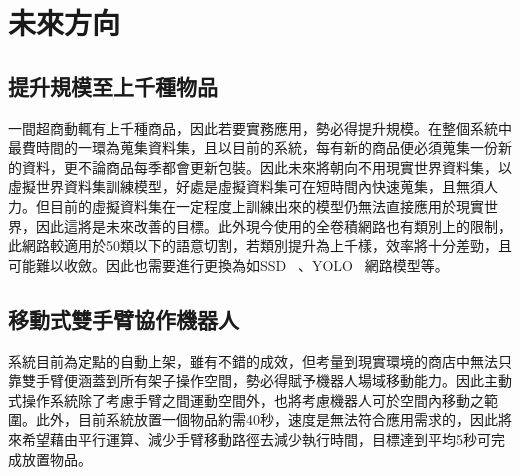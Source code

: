 \section{未來方向}

\subsection{提升規模至上千種物品}
一間超商動輒有上千種商品，因此若要實務應用，勢必得提升規模。在整個系統中最費時間的一環為蒐集資料集，且以目前的系統，每有新的商品便必須蒐集一份新的資料，更不論商品每季都會更新包裝。因此未來將朝向不用現實世界資料集，以虛擬世界資料集訓練模型，好處是虛擬資料集可在短時間內快速蒐集，且無須人力。但目前的虛擬資料集在一定程度上訓練出來的模型仍無法直接應用於現實世界，因此這將是未來改善的目標。此外現今使用的全卷積網路也有類別上的限制，此網路較適用於50類以下的語意切割，若類別提升為上千樣，效率將十分差勁，且可能難以收斂。因此也需要進行更換為如SSD ~\cite{liu2016ssd}、YOLO ~\cite{redmon2016you}網路模型等。

\subsection{移動式雙手臂協作機器人}
系統目前為定點的自動上架，雖有不錯的成效，但考量到現實環境的商店中無法只靠雙手臂便涵蓋到所有架子操作空間，勢必得賦予機器人場域移動能力。因此主動式操作系統除了考慮手臂之間運動空間外，也將考慮機器人可於空間內移動之範圍。此外，目前系統放置一個物品約需40秒，速度是無法符合應用需求的，因此將來希望藉由平行運算、減少手臂移動路徑去減少執行時間，目標達到平均5秒可完成放置物品。
